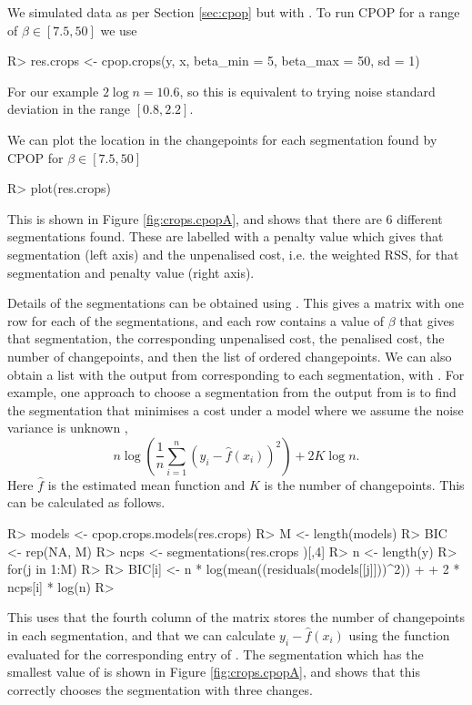 \documentclass[nojss]{jss}
\begin{document}
We simulated data as per Section \ref{sec:cpop} but with . To run CPOP for a range of $\beta\in[7.5, 50]$ we use
\begin{CodeInput}
R> res.crops <- cpop.crops(y, x, beta_min = 5, beta_max = 50, sd = 1)
\end{CodeInput}
For our example $2 \log n = 10.6$, so this is equivalent to trying noise standard deviation in the range $[0.8,2.2]$. 

We can plot the location in the changepoints for each segmentation found by CPOP for $\beta\in[7.5,50]$
\begin{CodeInput}
R> plot(res.crops)
\end{CodeInput}
This is shown in Figure \ref{fig:crops.cpopA}, and shows that there are 6 different segmentations found. These are labelled with a penalty value which gives that segmentation (left axis) and the unpenalised cost, i.e. the weighted RSS, for that segmentation and penalty value (right axis).

Details of the segmentations can be obtained using . This gives a matrix with one row for each of the segmentations, and each row contains a value of $\beta$ that gives that segmentation, the corresponding unpenalised cost, the penalised cost, the number of changepoints, and then the list of ordered changepoints. 
%
%
We can also obtain a list with the output from  corresponding to each segmentation, with . For example, one approach to choose a segmentation from the output from  is to find the segmentation that minimises a cost under a model where we assume the noise variance is unknown \citep{fryzlewicz2014wild},
\[
 n \log \left( \frac{1}{n} \sum_{i=1}^n \left(y_i-\hat{f}(x_i)\right)^2
\right) + 2 K \log n.
\]
Here $\hat{f}$ is the estimated mean function and $K$ is the number of changepoints. This can be calculated as follows.
\begin{CodeChunk}
\begin{CodeInput}
R> models <- cpop.crops.models(res.crops)
R> M <- length(models)
R> BIC <- rep(NA, M)
R> ncps <- segmentations(res.crops )[,4]
R> n <- length(y)
R> for(j in 1:M)
R> {
R>   BIC[i] <- n * log(mean((residuals(models[[j]]))^2)) 
+    + 2 * ncps[i] * log(n)
R> }
\end{CodeInput}
\end{CodeChunk}
This uses that the fourth column of the matrix  stores the number of changepoints in each segmentation, and that we can calculate $y_i - \hat{f}(x_i)$ using the  function evaluated for the corresponding entry of . The segmentation which has the smallest value of  is shown in Figure \ref{fig:crops.cpopA}, and shows that this correctly chooses the segmentation with three changes.
\end{document}
